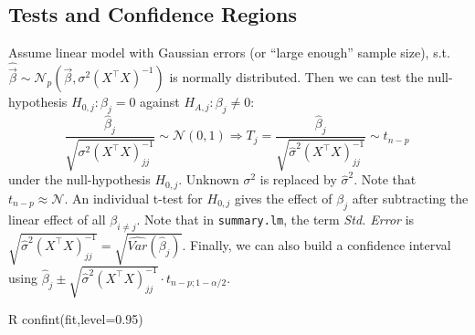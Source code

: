 \subsection{Tests and Confidence Regions}\label{subsec:tests_and_confidence_regions}
\begin{sectionbox}[T-test]\nospacing{}
  Assume linear model with Gaussian errors (or ``large enough'' sample size), s.t. $\hat{\vec{\beta}} \sim \mathcal{N}_{p}\left(\vec{\beta}, \sigma^{2}{(X^{\top}X)}^{-1}\right)$ is normally distributed.
  Then we can test the null-hypothesis $H_{0,j}: \beta_{j} = 0$ against $H_{A,j}: \beta_{j} \neq 0$:
  \[\frac{\hat \beta_{j}}{\sqrt{\sigma^{2}{{(X^{\top}X)}^{-1}_{jj}}}} \sim \mathcal{N}(0,1) \Rightarrow  T_{j} = \frac{\hat \beta_{j}}{\sqrt{\hat \sigma^{2}{{(X^{\top}X)}^{-1}_{jj}}}} \sim t_{n-p}\ \] under the null-hypothesis $H_{0,j}$. Unknown $\sigma^{2}$ is replaced by $\hat \sigma^{2}$. Note that $t_{n-p} \approx \mathcal{N}$.
  An individual t-test for $H_{0,j}$ gives the effect of $\beta_{j}$ after subtracting the linear effect of all $\beta_{i\neq j}$.
  Note that in \verb!summary.lm!, the term \emph{Std. Error} is $\sqrt{\hat \sigma^{2}{{(X^{\top}X)}^{-1}_{jj}}} = \sqrt{\hat{Var}(\hat \beta_{j})}$. Finally, we can also build a confidence interval using $\hat \beta_{j} \pm \sqrt{\hat \sigma^{2}{{(X^{\top}X)}^{-1}_{jj}}} \cdot t_{n-p;1-\alpha/2}$.
\begin{mintlinebox}{R}
  confint(fit,level=0.95)
\end{mintlinebox}
\end{sectionbox}

